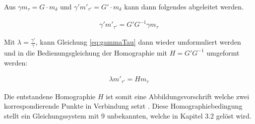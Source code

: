 Aus $\gamma m_\tau = G\cdot m_\delta$ und $\gamma' m'_{\tau'} = G'\cdot m_{\delta}$ kann dann folgendes abgeleitet werden\cite{Elements}.

\begin{gather}
	\gamma' m'_{\tau'} = G' G^{-1} \gamma m_\tau \label{eq:gammaTau}
\end{gather}

Mit $\lambda= \frac{\gamma'}{\gamma}$, kann Gleichung \ref{eq:gammaTau} dann wieder umformuliert werden und in die Bedienungsgleichung der Homographie mit $H=G' G^{-1}$ umgeformt werden:

\begin{gather}
	\lambda m'_{\tau'} = H m_\tau\label{eq:H}
\end{gather} 


Die entstandene Homographie $H$ ist somit eine Abbildungsvorschrift welche zwei korrespondierende Punkte in Verbindung setzt \cite{Elements}. %
Diese Homographiebedingung stellt ein Gleichungssystem mit 9 unbekannten, welche in Kapitel 3.2 gelöst wird\cite{HZ}.



